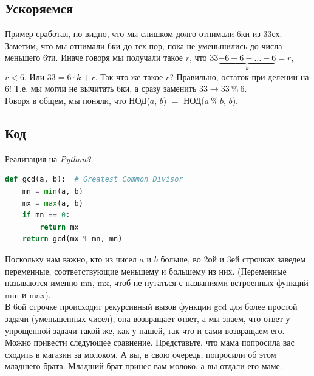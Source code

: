 \documentclass[12pt]{article} %
\begin{document}
\subsection{Ускоряемся}
Пример сработал, но видно, что мы слишком долго отнимали 6ки из 33ех. Заметим, что мы отнимали 6ки до тех пор, пока не уменьшились до числа меньшего 6ти. Иначе говоря мы получали такое $r$, что $33  \underbrace{- 6 - 6- \ldots -6}_{k} = r$, $r < 6$. Или $33 = 6\cdot k + r$. Так что же такое $r$? Правильно, остаток при делении на 6! Т.е. мы могли не вычитать 6ки, а сразу заменить $33 \rightarrow 33\ \%\ 6$.\\
Говоря в общем, мы поняли, что НОД($a$, $b$) $=$ НОД($a\ \%\ b$, $b$). 
\newpage
\subsection{Код}
Реализация на \textit{Python3}
\begin{lstlisting}[language=Python]
def gcd(a, b):  # Greatest Common Divisor
	mn = min(a, b)
	mx = max(a, b)
	if mn == 0:
		return mx
	return gcd(mx % mn, mn)
\end{lstlisting}
Поскольку нам важно, кто из чисел $a$ и $b$ больше, во 2ой и 3ей строчках заведем переменные, соответствующие меньшему и большему из них. (Переменные называются именно \colorbox{backcolour}{mn, mx}, чтоб не путаться с названиями встроенных функций \colorbox{backcolour}{\textcolor{codepink}{min}} и \colorbox{backcolour}{\textcolor{codepink}{max}}).\\
В 6ой строчке происходит рекурсивный вызов функции \colorbox{backcolour}{gcd} для более простой задачи (уменьшенных чисел), она возвращает ответ, а мы знаем, что ответ у упрощенной задачи такой же, как у нашей, так что и сами возвращаем его.\\
Можно привести следующее сравнение. Представьте, что мама попросила вас сходить в магазин за молоком. А вы, в свою очередь, попросили об этом младшего брата. Младший брат принес вам молоко, а вы отдали его маме.
\end{document}
